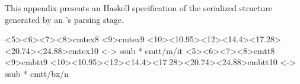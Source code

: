 \label{sec:abcm2ps_parser_ir}

This appendix presents an Haskell specification of the serialized structure generated by an
\abcpt{}'s parsing stage.\\

%
%
\makeatletter
{}%
  {%
   \newcommand\SkipToFmtEnd{}%
   \newcommand\EndFmtInput{}%
   \long\def\SkipToFmtEnd#1\EndFmtInput{}%
  }\SkipToFmtEnd

\newcommand\ReadOnlyOnce[1]{\@ifundefined{#1}{\@namedef{#1}{}}\SkipToFmtEnd}
  {<5><6><7><8>cmtex8
   <9>cmtex9
   <10><10.95><12><14.4><17.28><20.74><24.88>cmtex10}{}
  {<-> ssub * cmtt/m/it}{}
\newcommand{\texfamily}{\fontfamily{cmtex}\selectfont}
  {<5><6><7><8>cmtt8
   <9>cmbtt9
   <10><10.95><12><14.4><17.28><20.74><24.88>cmbtt10}{}
  {<-> ssub * cmtt/bx/n}{}
\newcommand{\tex}[1]{\text{\texfamily#1}}	%

\newcommand{\Sp}{\hskip.33334em\relax}


\newcommand{\Conid}[1]{\mathit{#1}}
\newcommand{\Varid}[1]{\mathit{#1}}
\newcommand{\anonymous}{\kern0.06em \vbox{\hrule\@width.5em}}
\newcommand{\plus}{\mathbin{+\!\!\!+}}
\newcommand{\bind}{\mathbin{>\!\!\!>\mkern-6.7mu=}}
\newcommand{\rbind}{\mathbin{=\mkern-6.7mu<\!\!\!<}}%
\newcommand{\sequ}{\mathbin{>\!\!\!>}}
\renewcommand{\leq}{\leqslant}
\renewcommand{\geq}{\geqslant}

%
  {\newdimen\mathindent\mathindent\leftmargini}%
  {}%

\def\resethooks{%
  \global\let\SaveRestoreHook\empty
  \global\let\ColumnHook\empty}
\newcommand*{\savecolumns}[1][default]%
  {\g@addto@macro\SaveRestoreHook{\savecolumns[#1]}}
\newcommand*{\restorecolumns}[1][default]%
  {\g@addto@macro\SaveRestoreHook{\restorecolumns[#1]}}
\newcommand*{\aligncolumn}[2]%
  {\g@addto@macro\ColumnHook{\column{#1}{#2}}}

\resethooks

\newcommand{\onelinecommentchars}{\quad-{}- }
\newcommand{\commentbeginchars}{\enskip\{-}
\newcommand{\commentendchars}{-\}\enskip}

